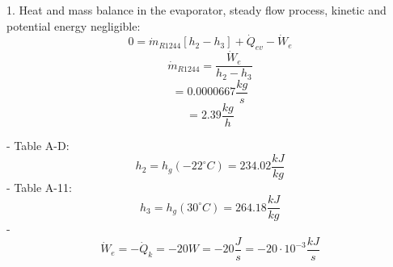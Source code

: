 1. Heat and mass balance in the evaporator, steady flow process, kinetic and potential energy negligible:
\[
0 = \dot{m}_{R1244} \left[ h_2 - h_3 \right] + \dot{Q}_{ev} - \dot{W}_e
\]
\[
\dot{m}_{R1244} = \frac{\dot{W}_e}{h_2 - h_3}
\]
\[
= 0.0000667 \frac{kg}{s}
\]
\[
= 2.39 \frac{kg}{h}
\]

- Table A-D:
\[
h_2 = h_g (-22^\circ C) = 234.02 \frac{kJ}{kg}
\]
- Table A-11:
\[
h_3 = h_g (30^\circ C) = 264.18 \frac{kJ}{kg}
\]
- 
\[
\dot{W}_e = -\dot{Q}_{k} = -20 W = -20 \frac{J}{s} = -20 \cdot 10^{-3} \frac{kJ}{s}
\]
